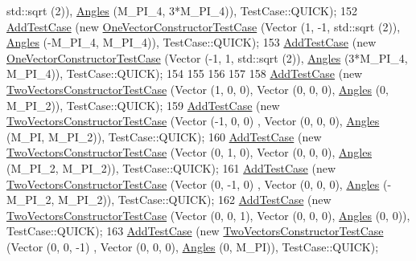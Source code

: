 \begin{DoxyCode}
      std::sqrt (2)), \hyperlink{structns3_1_1Angles}{Angles} (M\_PI\_4, 3*M\_PI\_4)), TestCase::QUICK);
152   \hyperlink{classns3_1_1TestCase_a3718088e3eefd5d6454569d2e0ddd835}{AddTestCase} (\textcolor{keyword}{new} \hyperlink{classOneVectorConstructorTestCase}{OneVectorConstructorTestCase} (Vector (1, -1, 
      std::sqrt (2)), \hyperlink{structns3_1_1Angles}{Angles} (-M\_PI\_4, M\_PI\_4)), TestCase::QUICK);
153   \hyperlink{classns3_1_1TestCase_a3718088e3eefd5d6454569d2e0ddd835}{AddTestCase} (\textcolor{keyword}{new} \hyperlink{classOneVectorConstructorTestCase}{OneVectorConstructorTestCase} (Vector (-1, 1, 
      std::sqrt (2)), \hyperlink{structns3_1_1Angles}{Angles} (3*M\_PI\_4, M\_PI\_4)), TestCase::QUICK);
154 
155 
156 
157 
158   \hyperlink{classns3_1_1TestCase_a3718088e3eefd5d6454569d2e0ddd835}{AddTestCase} (\textcolor{keyword}{new} \hyperlink{classTwoVectorsConstructorTestCase}{TwoVectorsConstructorTestCase} (Vector (1, 0, 0),
           Vector (0, 0, 0), \hyperlink{structns3_1_1Angles}{Angles} (0, M\_PI\_2)), TestCase::QUICK);
159   \hyperlink{classns3_1_1TestCase_a3718088e3eefd5d6454569d2e0ddd835}{AddTestCase} (\textcolor{keyword}{new} \hyperlink{classTwoVectorsConstructorTestCase}{TwoVectorsConstructorTestCase} (Vector (-1, 0, 0)
      ,    Vector (0, 0, 0), \hyperlink{structns3_1_1Angles}{Angles} (M\_PI, M\_PI\_2)), TestCase::QUICK);
160   \hyperlink{classns3_1_1TestCase_a3718088e3eefd5d6454569d2e0ddd835}{AddTestCase} (\textcolor{keyword}{new} \hyperlink{classTwoVectorsConstructorTestCase}{TwoVectorsConstructorTestCase} (Vector (0, 1, 0),
           Vector (0, 0, 0), \hyperlink{structns3_1_1Angles}{Angles} (M\_PI\_2, M\_PI\_2)), TestCase::QUICK);
161   \hyperlink{classns3_1_1TestCase_a3718088e3eefd5d6454569d2e0ddd835}{AddTestCase} (\textcolor{keyword}{new} \hyperlink{classTwoVectorsConstructorTestCase}{TwoVectorsConstructorTestCase} (Vector (0, -1, 0)
      ,    Vector (0, 0, 0), \hyperlink{structns3_1_1Angles}{Angles} (-M\_PI\_2, M\_PI\_2)), TestCase::QUICK);
162   \hyperlink{classns3_1_1TestCase_a3718088e3eefd5d6454569d2e0ddd835}{AddTestCase} (\textcolor{keyword}{new} \hyperlink{classTwoVectorsConstructorTestCase}{TwoVectorsConstructorTestCase} (Vector (0, 0, 1),
           Vector (0, 0, 0), \hyperlink{structns3_1_1Angles}{Angles} (0, 0)), TestCase::QUICK);
163   \hyperlink{classns3_1_1TestCase_a3718088e3eefd5d6454569d2e0ddd835}{AddTestCase} (\textcolor{keyword}{new} \hyperlink{classTwoVectorsConstructorTestCase}{TwoVectorsConstructorTestCase} (Vector (0, 0, -1)
      ,    Vector (0, 0, 0), \hyperlink{structns3_1_1Angles}{Angles} (0, M\_PI)), TestCase::QUICK);

\end{DoxyCode}
